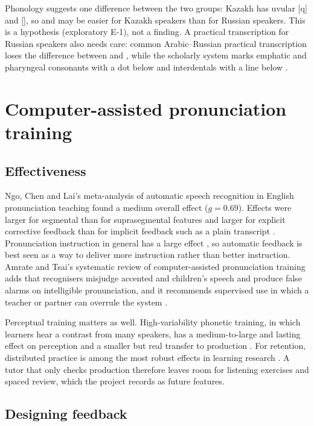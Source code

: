 Phonology suggests one difference between the two groups: Kazakh has uvular [q] and [], so 
and  may be easier for Kazakh speakers than for Russian speakers. This is a hypothesis (exploratory E-1), not a
finding. A practical transcription for Russian speakers also needs care: common Arabic--Russian practical
transcription loses the difference between  and , while the scholarly system marks emphatic
and pharyngeal consonants with a dot below and interdentals with a line below \cite{SRC-051}.

\section{Computer-assisted pronunciation training}\label{sec:lr-capt}

\subsection{Effectiveness}

Ngo, Chen and Lai's meta-analysis of automatic speech recognition in English pronunciation teaching found
a medium overall effect ($g=0.69$). Effects were larger for segmental than for suprasegmental features
and larger for explicit corrective feedback than for implicit feedback such as a plain transcript
\cite{SRC-025}. Pronunciation instruction in general has a large effect \cite{SRC-105}, so automatic
feedback is best seen as a way to deliver more instruction rather than better instruction. Amrate and
Tsai's systematic review of computer-assisted pronunciation training adds that recognisers misjudge
accented and children's speech and produce false alarms on intelligible pronunciation, and it recommends
supervised use in which a teacher or partner can overrule the system \cite{SRC-026}.

Perceptual training matters as well. High-variability phonetic training, in which learners hear a contrast
from many speakers, has a medium-to-large and lasting effect on perception \cite{SRC-044} and a smaller
but real transfer to production \cite{SRC-045}. For retention, distributed practice is among the most
robust effects in learning research \cite{SRC-107}. A tutor that only checks production therefore leaves
room for listening exercises and spaced review, which the project records as future features.

\subsection{Designing feedback}

